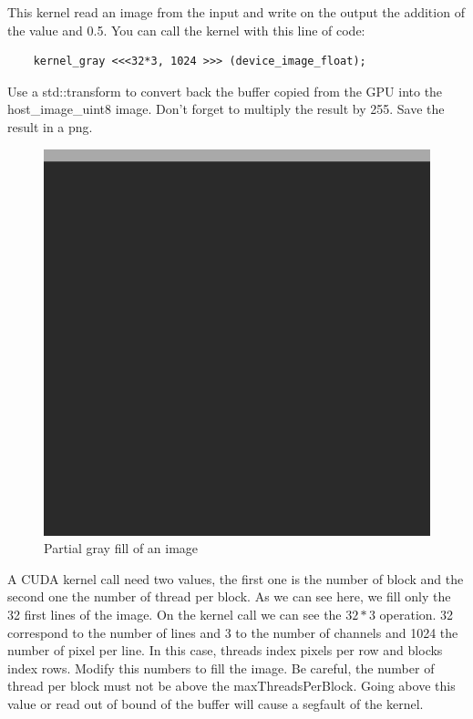 \documentclass{article}
\begin{document}
This kernel read an image from the input and write on the output the addition of the value and 0.5. You can call the kernel with this line of code:
\begin{lstlisting}
	kernel_gray <<<32*3, 1024 >>> (device_image_float);
\end{lstlisting}
Use a std::transform to convert back the buffer copied from the GPU into the host\_image\_uint8 image. Don't forget to multiply the result by 255. Save the result in a png.\\
\begin{figure}[H]
	\centering
	\includegraphics[scale=0.2]{figures/gray_faild.png}
	\caption{Partial gray fill of an image}
\end{figure}
A CUDA kernel call need two values, the first one is the number of block and the second one the number of thread per block. As we can see here, we fill only the 32 first lines of the image. On the kernel call we can see the $32*3$ operation. 32 correspond to the number of lines and 3 to the number of channels and 1024 the number of pixel per line. In this case, threads index pixels per row and blocks index rows. Modify this numbers to fill the image. Be careful, the number of thread per block must not be above the maxThreadsPerBlock. Going above this value or read out of bound of the buffer will cause a segfault of the kernel.
\end{document}

